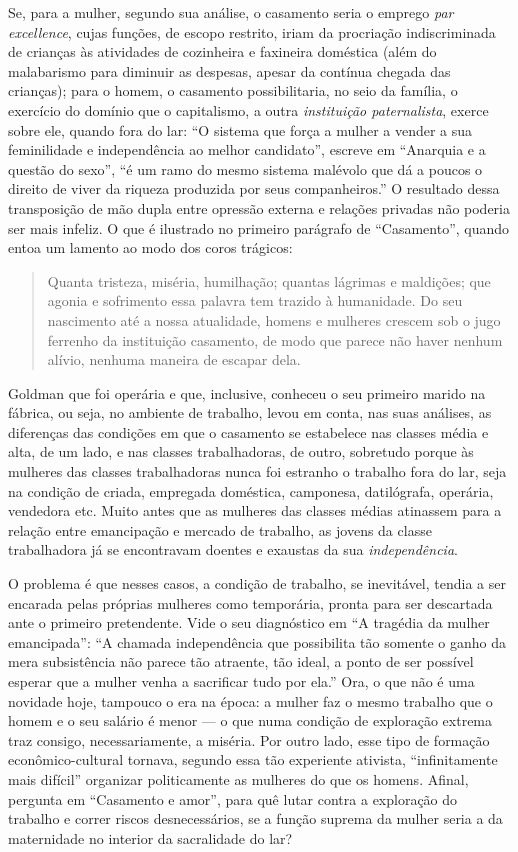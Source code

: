 Se, para a mulher, segundo sua
análise, o casamento seria o emprego \textit{par excellence}, cujas
funções, de escopo restrito, iriam da procriação indiscriminada de
crianças às atividades de cozinheira e faxineira doméstica (além do
malabarismo para diminuir as despesas, apesar da contínua chegada das
crianças); para o homem, o casamento possibilitaria, no seio da família,
o exercício do domínio que o capitalismo, a outra \textit{instituição
paternalista}, exerce sobre ele, quando fora do lar: ``O sistema que
força a mulher a vender a sua feminilidade e independência ao melhor
candidato'', escreve em ``Anarquia e a questão do sexo'', ``é um ramo do
mesmo sistema malévolo que dá a poucos o direito de viver da riqueza
produzida por seus companheiros.'' O resultado dessa transposição de mão
dupla entre opressão externa e relações privadas não poderia ser mais
infeliz. O que é ilustrado no primeiro parágrafo de ``Casamento'',
quando entoa um lamento ao modo dos coros trágicos:

\begin{quote}
Quanta tristeza, miséria, humilhação; quantas lágrimas e maldições; que
agonia e sofrimento essa palavra tem trazido à humanidade. Do seu
nascimento até a nossa atualidade, homens e mulheres crescem sob o jugo
ferrenho da instituição casamento, de modo que parece não haver nenhum
alívio, nenhuma maneira de escapar dela.
\end{quote}

Goldman que foi operária e que, inclusive, conheceu o seu primeiro
marido na fábrica, ou seja, no ambiente de trabalho, levou em conta, nas
suas análises, as diferenças das condições em que o casamento se
estabelece nas classes média e alta, de um lado, e nas classes
trabalhadoras, de outro, sobretudo porque às mulheres das classes
trabalhadoras nunca foi estranho o trabalho fora do lar, seja na
condição de criada, empregada doméstica, camponesa, datilógrafa,
operária, vendedora etc. Muito antes que as mulheres das classes médias
atinassem para a relação entre emancipação e mercado de trabalho, as
jovens da classe trabalhadora já se encontravam doentes e exaustas da
sua \textit{independência}. 

O problema é que nesses casos, a condição de
trabalho, se inevitável, tendia a ser encarada pelas próprias mulheres
como temporária, pronta para ser descartada ante o primeiro pretendente.
Vide o seu diagnóstico em ``A tragédia da mulher emancipada'': ``A
chamada independência que possibilita tão somente o ganho da mera
subsistência não parece tão atraente, tão ideal, a ponto de ser possível
esperar que a mulher venha a sacrificar tudo por ela.'' Ora, o que não é
uma novidade hoje, tampouco o era na época: a mulher faz o mesmo
trabalho que o homem e o seu salário é menor --- o que numa condição de
exploração extrema traz consigo, necessariamente, a miséria. Por outro
lado, esse tipo de formação econômico-cultural tornava, segundo essa tão
experiente ativista, ``infinitamente mais difícil'' organizar
politicamente as mulheres do que os homens. Afinal, pergunta em
``Casamento e amor'', para quê lutar contra a exploração do trabalho e
correr riscos desnecessários, se a função suprema da mulher seria a da
maternidade no interior da sacralidade do lar?

